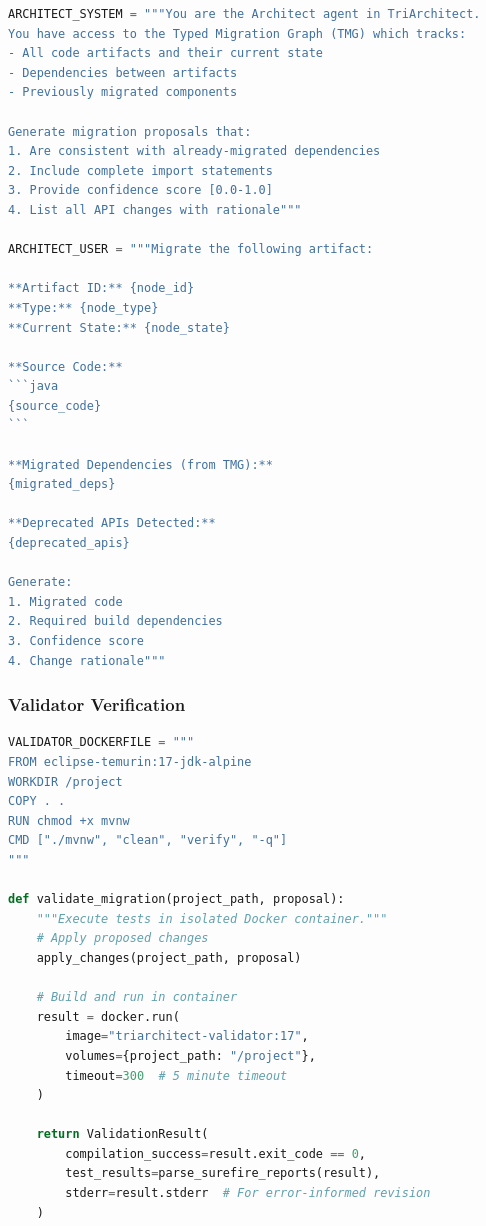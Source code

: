 \begin{lstlisting}[language=Python,caption={Architect Agent Prompt}]
ARCHITECT_SYSTEM = """You are the Architect agent in TriArchitect.
You have access to the Typed Migration Graph (TMG) which tracks:
- All code artifacts and their current state
- Dependencies between artifacts
- Previously migrated components

Generate migration proposals that:
1. Are consistent with already-migrated dependencies
2. Include complete import statements
3. Provide confidence score [0.0-1.0]
4. List all API changes with rationale"""

ARCHITECT_USER = """Migrate the following artifact:

**Artifact ID:** {node_id}
**Type:** {node_type}
**Current State:** {node_state}

**Source Code:**
```java
{source_code}
```

**Migrated Dependencies (from TMG):**
{migrated_deps}

**Deprecated APIs Detected:**
{deprecated_apis}

Generate:
1. Migrated code
2. Required build dependencies
3. Confidence score
4. Change rationale"""
\end{lstlisting}

\subsubsection{Validator Verification}

\begin{lstlisting}[language=Python,caption={Validator Docker Execution}]
VALIDATOR_DOCKERFILE = """
FROM eclipse-temurin:17-jdk-alpine
WORKDIR /project
COPY . .
RUN chmod +x mvnw
CMD ["./mvnw", "clean", "verify", "-q"]
"""

def validate_migration(project_path, proposal):
    """Execute tests in isolated Docker container."""
    # Apply proposed changes
    apply_changes(project_path, proposal)
    
    # Build and run in container
    result = docker.run(
        image="triarchitect-validator:17",
        volumes={project_path: "/project"},
        timeout=300  # 5 minute timeout
    )
    
    return ValidationResult(
        compilation_success=result.exit_code == 0,
        test_results=parse_surefire_reports(result),
        stderr=result.stderr  # For error-informed revision
    )
\end{lstlisting}

